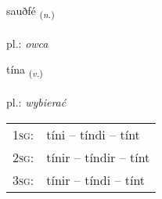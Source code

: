 \documentclass[frontgrid, backgrid]{flacards}\usepackage[]{graphicx}\usepackage[]{xcolor}
\begin{document}
\renewcommand{\flhead}{\vskip5pt \fboxsep=0pt {\small\bfseries\footnotesize Nafnorð | rzeczownik}}
\renewcommand{\fcfoot}{\vskip5pt \fboxsep=0pt \hspace{2pt}{\small\bfseries\footnotesize 3K}}

\renewcommand{\blhead}{\vskip5pt {\small\bfseries\footnotesize Nafnorð | rzeczownik }}
\renewcommand{\bcfoot}{\vskip5pt \hspace{2pt}{\small\bfseries\footnotesize 3K}}


{sauðfé \small{\textsubscript{(\textit{n.})}} \\[1ex] %
\textphonetic{[sœiðfjɛ]} \\
pl.: \emph{owca} \\  [2ex]
\renewcommand*{\arraystretch}{0.8}
}

\renewcommand{\flhead}{\vskip5pt \fboxsep=0pt {\small\bfseries\footnotesize Sagnorð | czasownik}}
\renewcommand{\fcfoot}{\vskip5pt \fboxsep=0pt \hspace{2pt}{\small\bfseries\footnotesize 3K}}

\renewcommand{\blhead}{\vskip5pt {\small\bfseries\footnotesize Sagnorð | czasownik }}
\renewcommand{\bcfoot}{\vskip5pt \hspace{2pt}{\small\bfseries\footnotesize 3K}}


{tína \small{\textsubscript{(\textit{v.})}} \\[1ex] %
\textphonetic{[tʰiːna]} \\
pl.: \emph{wybierać} \\  [2ex]
\renewcommand*{\arraystretch}{0.8}
\begin{tabular}{p{1cm}l}
\textsc{1sg}: & tíni -- tíndi -- tínt \\ 
\textsc{2sg}: & tínir -- tíndir -- tínt \\ 
\textsc{3sg}: & tínir -- tíndi -- tínt \\ 
\end{tabular}
}
\end{document}
